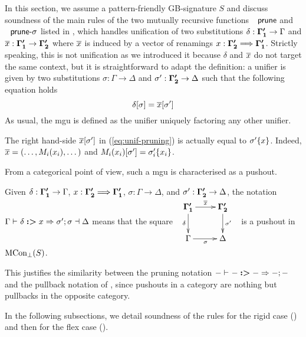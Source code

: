 \label{sec:pruning-phase}In this section, we assume a pattern-friendly
GB-signature $S$ and discuss soundness of the main rules of the two
mutually recursive functions $\AgdaFunction{prune}$ and $\AgdaFunction{prune-\ensuremath{\sigma}}$
listed in , which handles unification of two
substitutions $\delta:\boldsymbol{\Gamma'_{1}}\rightarrow\Gamma$
and $\overline{x}:\boldsymbol{\Gamma'_{1}}\rightarrow\boldsymbol{\Gamma'_{2}}$
where $\overline{x}$ is induced by a vector of renamings $x:\boldsymbol{\Gamma'_{2}}\Longrightarrow\boldsymbol{\Gamma'_{1}}$.
Strictly speaking, this is not unification as we introduced it because
$\delta$ and $\overline{x}$ do not target the same context,
but it is straightforward to adapt the definition: a unifier is given
by two substitutions $\sigma:\Gamma\rightarrow\Delta$ and $\sigma':\boldsymbol{\Gamma'_{2}}\rightarrow\Delta$
such that the following equation holds
\begin{equation}
\delta[\sigma]=\overline{x}[\sigma']\label{eq:unif-pruning}
\end{equation}
As usual, the mgu is defined as the unifier uniquely factoring any
other unifier. 
\begin{remark}
\label{rem:cocone-pruning}The right hand-side $\overline{x}[\sigma']$
in (\ref{eq:unif-pruning}) is actually equal to $\sigma'\{x\}$.
Indeed, $\overline{x}=(\dots,M_{i}(x_{i}),\dots)$ and $M_{i}(x_{i})[\sigma']=\sigma'_{i}\{x_{i}\}$.
\end{remark}
From a categorical point of view, such a mgu is characterised as a
pushout.
\begin{notation}
Given $\delta:\boldsymbol{\Gamma'_{1}}\rightarrow\Gamma$, $x:\boldsymbol{\Gamma'_{2}}\Longrightarrow\boldsymbol{\Gamma'_{1}}$,
$\sigma:\Gamma\rightarrow\Delta$, and $\sigma':\boldsymbol{\Gamma'_{2}}\rightarrow\Delta$,
the notation $\Gamma\vdash_{}\delta\boldsymbol{:>}x\Rightarrow\sigma';\sigma\dashv\Delta$
means that the square $\begin{array}{c}
\xymatrix{\dotmcontext{\Gamma'_{1}}\ar[r]^{\substofrenamings x}\ar[d]_{\delta} & \dotmcontext{\Gamma'_{2}}\ar[d]^{\sigma'}\\
\Gamma\ar[r]_{\sigma} & \Delta
}
\end{array}$ is a pushout in $\mathrm{MCon_{\bot}}(S)$.
\end{notation}
\begin{remark}
\label{rem:pushout-notation}This justifies the similarity between
the pruning notation $-\vdash_{}-\boldsymbol{:>}-\Rightarrow-;-$ and the pullback notation
of , since pushouts in a category
are nothing but pullbacks in the opposite category.
\end{remark}
In the following subsections, we detail soundness of the rules for
the rigid case () and then for the flex case
().

